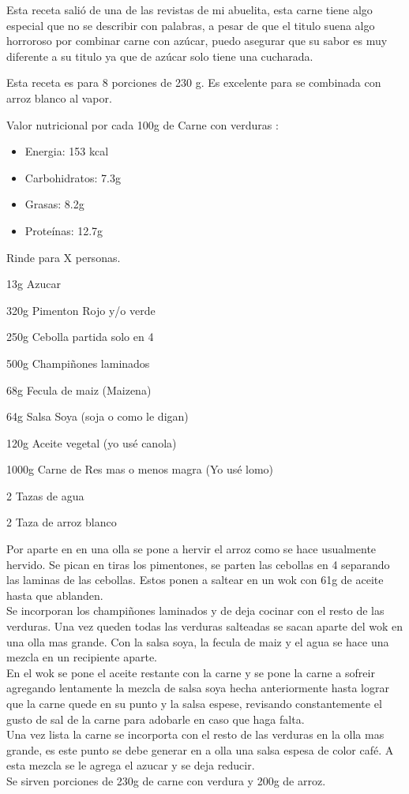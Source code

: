Esta receta salió de una de las revistas de mi abuelita, esta carne tiene algo especial que no se describir con palabras, a pesar de que el titulo suena algo horroroso por combinar carne con azúcar, puedo asegurar que su sabor es muy diferente a su titulo ya que de azúcar solo tiene una cucharada.

Esta receta es para 8 porciones de 230 g. Es excelente para se combinada con arroz blanco al vapor.

Valor nutricional por cada 100g de Carne con verduras :
\begin{itemize}
\item Energia: 153 kcal
\item Carbohidratos: 7.3g
\item Grasas: 8.2g
\item Proteínas: 12.7g
\end{itemize}

Rinde para X personas.

\begin{ingredientes}
\item 13g Azucar
\item 320g Pimenton Rojo y/o verde
\item 250g Cebolla partida solo en 4
\item 500g Champiñones laminados
\item 68g Fecula de maiz (Maizena)
\item 64g Salsa Soya (soja o como le digan)
\item 120g Aceite vegetal (yo usé canola)
\item 1000g Carne de Res mas o menos magra (Yo usé lomo)
\item 2 Tazas de agua
\item 2 Taza de arroz blanco
\end{ingredientes}
\preparacion
Por aparte en en una olla se pone a hervir el arroz como se hace usualmente hervido. Se pican en tiras los pimentones, se parten las cebollas en 4 separando las laminas de las cebollas. Estos ponen a saltear en un wok con 61g de aceite hasta que ablanden.\\

Se incorporan los champiñones laminados y de deja cocinar con el resto de las verduras. Una vez queden todas las verduras salteadas se sacan aparte del wok en una olla mas grande. Con la salsa soya, la fecula de maiz y el agua se hace una mezcla en un recipiente aparte.\\

En el wok se pone el aceite restante con la carne y se pone la carne a sofreir agregando lentamente la mezcla de salsa soya hecha anteriormente hasta lograr que la carne quede en su punto y la salsa espese, revisando constantemente el gusto de sal de la carne para adobarle en caso que haga falta.\\

Una vez lista la carne se incorporta con el resto de las verduras en la olla mas grande, es este punto se debe generar en a olla una salsa espesa de color café. A esta mezcla se le agrega el azucar y se deja reducir.\\

Se sirven porciones de 230g de carne con verdura y 200g de arroz.